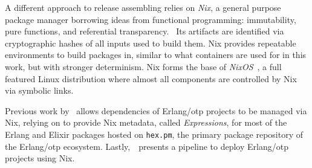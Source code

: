 A different approach to release assembling relies on \emph{Nix}, a general purpose package manager borrowing ideas from functional programming: immutability, pure functions, and referential transparency.~\cite{nix1} Its artifacts are identified via cryptographic hashes of all inputs used to build them. Nix provides repeatable environments to build packages in, similar to what containers are used for in this work, but with stronger determinism. Nix forms the base of \emph{NixOS}~\cite{nixos}, a full featured Linux distribution where almost all components are controlled by Nix via symbolic links.

Previous work by~\cite{erlangnix} allows dependencies of Erlang/\acrshort{otp} projects to be managed via Nix, relying on \cite{hex2nix} to provide Nix metadata, called \emph{Expressions}, for most of the Erlang and Elixir packages hosted on \lstinline|hex.pm|, the primary package repository of the Erlang/\acrshort{otp} ecosystem. Lastly,~\cite{erlangnix2}~presents a pipeline to deploy Erlang/\acrshort{otp} projects using Nix.
